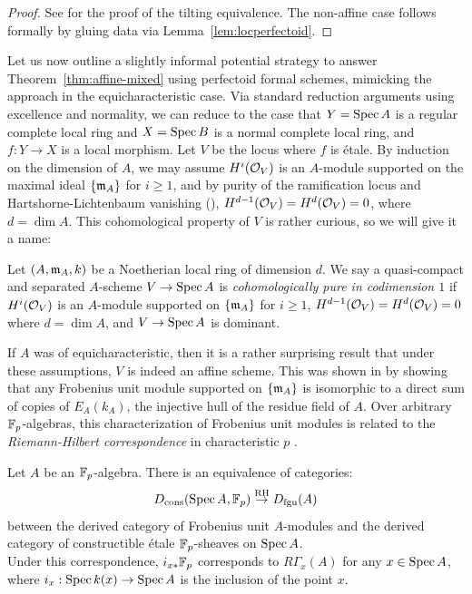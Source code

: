 \begin{proof}
See \cite[Proposition 2.1.9]{purflat} for the proof of the tilting equivalence. The non-affine case follows formally
by gluing data via Lemma~\ref{lem:locperfectoid}.
\end{proof}
Let us now outline a slightly informal potential strategy to answer Theorem~\ref{thm:affine-mixed} using perfectoid formal schemes,
mimicking the approach in the equicharacteristic case.
Via standard reduction arguments using excellence and normality, we can reduce to the case that $Y=\spec{A}$ is a regular complete local ring
and $X=\spec{B}$ is a normal complete local ring, and $f:Y \to X$ is a local morphism. Let $V$ be the locus where $f$ is \'{e}tale. 
By induction on the dimension of $A$, we may assume $H^i(\cal{O}_V)$ is an $A$-module supported on the maximal ideal $\{\ideal{m}_A\}$ for $i \ge 1$, 
and by purity of the ramification locus and Hartshorne-Lichtenbaum vanishing (\cite[0EB7]{sp}), $H^{d-1}(\cal{O}_V) = H^{d}(\cal{O}_V) = 0$, where $d = \dim{A}$. 
This cohomological property of $V$ is rather curious, so we will give it a name:
\begin{definition}\label{def:cohpure}
Let $(A,\ideal{m}_A,k)$ be a Noetherian local ring of dimension $d$. We say a quasi-compact and separated $A$-scheme $V \to \spec{A}$ is \textit{cohomologically pure in codimension $1$} 
if $H^i(\cal{O}_V)$ is an $A$-module supported on $\{\ideal{m}_A\}$ for $i \ge 1$, 
$H^{d-1}(\cal{O}_V) = H^{d}(\cal{O}_V) = 0$ where $d = \dim{A}$, and $V \to \spec{A}$ is dominant.
\end{definition}
If $A$ was of equicharacteristic, then it is a rather surprising result that under these assumptions, $V$ is indeed an affine scheme. This
was shown in \cite[0ECC]{sp} by showing that any Frobenius unit module supported on $\{\ideal{m}_A\}$ is isomorphic to a direct
sum of copies of $E_{A}(k_A)$, the injective hull of the residue field of $A$. Over arbitrary $\bb{F}_p$-algebras,
this characterization of Frobenius unit modules is related to the \textit{Riemann-Hilbert correspondence} in characteristic $p$ \cite{rhbl}.
\begin{theorem}\label{thm:rhbl}
Let $A$ be an $\bb{F}_p$-algebra. There is an equivalence of categories:
\[D_{\mathrm{cons}}(\spec{A}, \bb{F}_p) \stackrel{\mathrm{RH}}{\to} D_{\mathrm{fgu}}(A)\]
between the derived category of Frobenius unit $A$-modules and the derived category of constructible \'{e}tale $\bb{F}_p$-sheaves on $\spec{A}$.\\
\indent Under this correspondence, $i_{x*} \bb{F}_p$ corresponds to $R\Gamma_{x}(A)$ for any $x \in \spec{A}$, where $i_x: \spec{k(x)} \to \spec{A}$ 
is the inclusion of the point $x$. \cite[Theorem 12.6.1]{rhbl}
\end{theorem}
